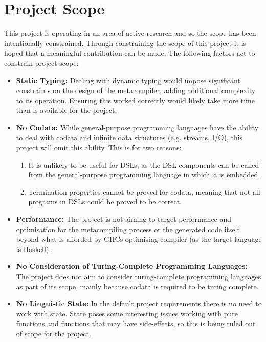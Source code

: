 \documentclass[a4paper,11pt]{report}
\begin{document}

\section{Project Scope} %
\label{sec:project_scope}
This project is operating in an area of active research and so the scope has been intentionally constrained.
Through constraining the scope of this project it is hoped that a meaningful contribution can be made. 
The following factors act to constrain project scope:
\begin{itemize}
    \item \textbf{Static Typing:} Dealing with dynamic typing would impose significant constraints on the design of the metacompiler, adding additional complexity to its operation.
    Ensuring this worked correctly would likely take more time than is available for the project.
    \item \textbf{No Codata:} While general-purpose programming languages have the ability to deal with codata and infinite data structures (e.g. streams, I/O), this project will omit this ability.
    This is for two reasons:
    \begin{enumerate}
        \item It is unlikely to be useful for DSLs, as the DSL components can be called from the general-purpose programming language in which it is embedded.
        \item Termination properties cannot be proved for codata, meaning that not all programs in DSLs could be proved to be correct.
    \end{enumerate}
    \item \textbf{Performance:} The project is not aiming to target performance and optimisation for the metacompiling process or the generated code itself beyond what is afforded by GHCs optimising compiler (as the target language is Haskell).
    \item \textbf{No Consideration of Turing-Complete Programming Languages:} The project does not aim to consider turing-complete programming languages as part of its scope, mainly because codata is required to be turing complete.
    \item \textbf{No Linguistic State:} In the default project requirements there is no need to work with state. 
    State poses some interesting issues working with pure functions and functions that may have side-effects, so this is being ruled out of scope for the project.
\end{itemize}
\end{document}
